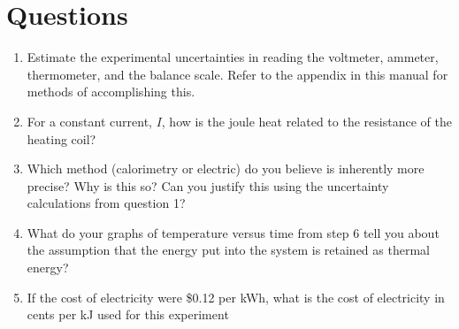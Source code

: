 \section{Questions}
\begin{enumerate}
	\item Estimate the experimental uncertainties in reading the voltmeter, ammeter, thermometer, and the balance scale.  Refer to the appendix in this manual for methods of accomplishing this. 
	\item For a constant current, $I$, how is the joule heat related to the resistance of the heating coil?
	\item Which method (calorimetry or electric) do you believe is inherently more precise?  Why is this so?  Can you justify this using the uncertainty calculations from question 1?
	\item What do your graphs of temperature versus time from step 6 tell you about the assumption that the energy put into the system is retained as thermal energy?
	\item If the cost of electricity were \$0.12 per kWh, what is the cost of electricity in cents per kJ used for this experiment
\end{enumerate}

